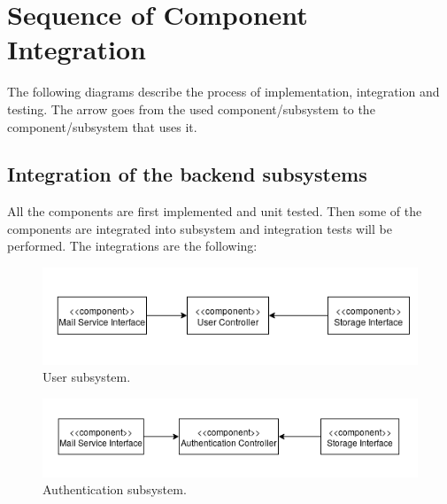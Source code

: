 \documentclass{report}
\begin{document}
\section{Sequence of Component Integration}
The following diagrams describe the process of implementation, integration
and testing. The arrow goes from the used component/subsystem to the
component/subsystem that uses it.
\subsection{Integration of the backend subsystems}
All the components are first implemented and unit tested. Then some of the components are integrated into subsystem and integration tests will be performed. The integrations are the following:
\begin{figure}[!ht]
	\begin{center}
	\includegraphics[width=\textwidth]{img/UserSub.png}
    \end{center}
    \label{fig:UserSub}
	\caption{User subsystem.}
\end{figure}
\begin{figure}[!ht]
	\begin{center}
	\includegraphics[width=\textwidth]{img/AuthSub.png}
    \end{center}
    \label{fig:AuthSub}
	\caption{Authentication subsystem.}
\end{figure}
\end{document}
